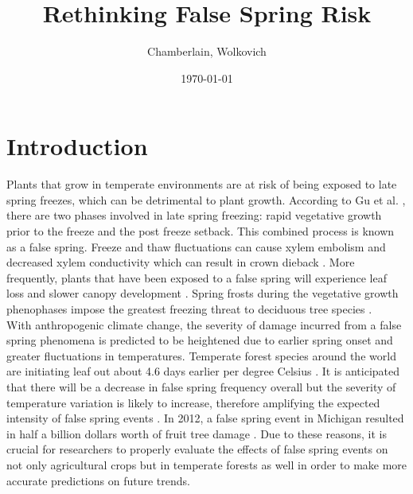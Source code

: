 \documentclass{article}\usepackage[]{graphicx}\usepackage[]{color}
\begin{document}
\title{Rethinking False Spring Risk}
\author{Chamberlain, Wolkovich}
\date{\today}
\maketitle 
\newpage
\tableofcontents
\listoffigures
\listoftables

\renewcommand{\thetable}{\arabic{table}}
\renewcommand{\thefigure}{\arabic{figure}}
\renewcommand{\labelitemi}{$-$}

\newpage
\section{Introduction}
Plants that grow in temperate environments are at risk of being exposed to late spring freezes, which can be detrimental to plant growth. According to Gu et al. \citeyear{Gu2008}, there are two phases involved in late spring freezing: rapid vegetative growth prior to the freeze and the post freeze setback. This combined process is known as a false spring. Freeze and thaw fluctuations can cause xylem embolism and decreased xylem conductivity which can result in crown dieback \citep{Gu2008}.
More frequently, plants that have been exposed to a false spring will experience leaf loss and slower canopy development \citep{Hufkens2012}. Spring frosts during the vegetative growth phenophases impose the greatest freezing threat to deciduous tree species \citep{Sakai1987}.
\\
With anthropogenic climate change, the severity of damage incurred from a false spring phenomena is predicted to be heightened due to earlier spring onset and greater fluctuations in temperatures. Temperate forest species around the world are initiating leaf out about 4.6 days earlier per degree Celsius \citep{Polgar2014, Wolkovich2012}. It is anticipated that there will be a decrease in false spring frequency overall but the severity of temperature variation is likely to increase, therefore amplifying the expected intensity of false spring events \citep{Allstadt2015}. In 2012, a false spring event in Michigan resulted in half a billion dollars worth of fruit tree damage \citep{Ault2013, Knudson2012}. Due to these reasons, it is crucial for researchers to properly evaluate the effects of false spring events on not only agricultural crops but in temperate forests as well in order to make more accurate predictions on future trends.
\end{document}

